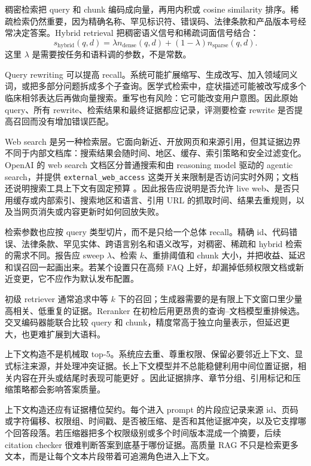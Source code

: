 \documentclass[UTF8,zihao=-4,openany]{ctexbook}
\begin{document}
稠密检索把 query 和 chunk 编码成向量，再用内积或 cosine similarity 排序。稀疏检索仍然重要，因为精确名称、罕见标识符、错误码、法律条款和产品版本号经常决定答案。Hybrid retrieval 把稠密语义信号和稀疏词面信号结合：
\[
  s_{\mathrm{hybrid}}(q,d)=
  \lambda n_{\mathrm{dense}}(q,d)+(1-\lambda)n_{\mathrm{sparse}}(q,d).
\]
这里 $\lambda$ 是需要按任务和语料调的参数，不是常数。

Query rewriting 可以提高 recall。系统可能扩展缩写、生成改写、加入领域同义词，或把多部分问题拆成多个子查询。医学式检索中，症状描述可能被改写成多个临床相邻表达后再做向量搜索。重写也有风险：它可能改变用户意图。因此原始 query、所有 rewrite、检索结果和最终证据都应记录，评测要检查 rewrite 是否提高召回而没有增加错误匹配。

Web search 是另一种检索层。它面向新近、开放网页和来源引用，但其证据边界不同于内部文档库：搜索结果会随时间、地区、缓存、索引策略和安全过滤变化。OpenAI 的 web search 文档区分普通搜索和由 reasoning model 驱动的 agentic search，并提供 \texttt{external\_web\_access} 这类开关来限制是否访问实时外网；文档还说明搜索工具上下文有固定预算 \cite{openai2026websearch}。因此报告应说明是否允许 live web、是否只用缓存或内部索引、搜索地区和语言、引用 URL 的抓取时间、结果去重规则，以及当网页消失或内容更新时如何回放失败。

检索参数也应按 query 类型切片，而不是只给一个总体 recall。精确 id、代码错误、法律条款、罕见实体、跨语言别名和语义改写，对稠密、稀疏和 hybrid 检索的需求不同。报告应 sweep $\lambda$、检索 $k$、重排阈值和 chunk 大小，并把收益、延迟和误召回一起画出来。若某个设置只在高频 FAQ 上好，却漏掉低频权限文档或新近变更，它不应作为默认发布配置。

初级 retriever 通常追求中等 $k$ 下的召回；生成器需要的是有限上下文窗口里少量高相关、低重复的证据。Reranker 在初检后用更昂贵的查询--文档模型重排候选。交叉编码器能联合比较 query 和 chunk，精度常高于独立向量表示，但延迟更大，也更难扩展到大语料。

上下文构造不是机械取 top-5。系统应去重、尊重权限、保留必要邻近上下文、显式标注来源，并处理冲突证据。长上下文模型并不总能稳健利用中间位置证据，相关内容在开头或结尾时表现可能更好 \cite{liu2023lost}。因此证据排序、章节分组、引用标记和压缩策略都会影响答案质量。

上下文构造还应有证据槽位契约。每个进入 prompt 的片段应记录来源 id、页码或字符偏移、权限组、时间戳、是否被压缩、是否和其他证据冲突，以及它支撑哪个回答段落。若压缩器把多个权限级别或多个时间版本混成一个摘要，后续 citation checker 很难判断答案到底基于哪份证据。高质量 RAG 不只是检索更多文本，而是让每个文本片段带着可追溯角色进入上下文。
\end{document}

